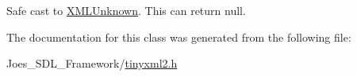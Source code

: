 Safe cast to \hyperlink{classtinyxml2_1_1_x_m_l_unknown}{X\-M\-L\-Unknown}. This can return null. 



The documentation for this class was generated from the following file\-:\begin{DoxyCompactItemize}
\item 
Joes\-\_\-\-S\-D\-L\-\_\-\-Framework/\hyperlink{tinyxml2_8h}{tinyxml2.\-h}\end{DoxyCompactItemize}
